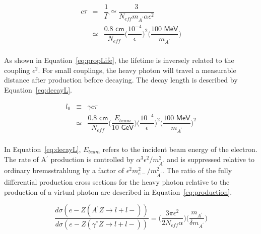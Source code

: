 \begin{eqnarray}
	\label{eq:propLife}
	c\tau &=& \dfrac{1}{\Gamma}\simeq \dfrac{3}{N_{eff}m_{A^{\prime}}\alpha\epsilon^2}\\
	&\simeq & \dfrac{0.8\textsf{ cm}}{N_{eff}}\Big({\dfrac{10^{-4}}{\epsilon}}\Big)^2\Big(\dfrac{100\textsf{ MeV}}{m_{A^{\prime}}}\Big)\\
\end{eqnarray}

As shown in Equation~\eqref{eq:propLife}, the lifetime is inversely related to the coupling $\epsilon^2$. For small couplings, the heavy photon will travel a measurable distance after production before decaying. The decay length is described by Equation~\eqref{eq:decayL}.

\begin{eqnarray}
	\label{eq:decayL}
	l_0 &\equiv &\gamma c \tau \\
	&\simeq & \dfrac{0.8\textsf{ cm}}{N_{eff}}\Big(\dfrac{E_{beam}}{10\textsf{ GeV}}\Big)\Big({\dfrac{10^{-4}}{\epsilon}}\Big)^2\Big(\dfrac{100\textsf{ MeV}}{m_{A^{\prime}}}\Big)^2\\
\end{eqnarray}

In Equation~\eqref{eq:decayL}, $E_{beam}$ refers to the incident beam energy of the electron. The rate of A$^{\prime}$ production is controlled by $\alpha^3\epsilon^2/m_{A^{\prime}}^2$ and is suppressed relative to ordinary bremsstrahlung by a factor of $\epsilon^2m_{e-}^2/m_{A^{\prime}}^2$. The ratio of the fully differential production cross sections for the heavy photon relative to the production of a virtual photon are described in Equation~\eqref{eq:production}.

\begin{equation}
	\label{eq:production}
	\dfrac{d\sigma(e-Z(A^{\prime}Z\rightarrow l+l-))}{d\sigma(e-Z(\gamma^{\ast}Z\rightarrow l+l-))} = \Big(\dfrac{3\pi\epsilon^2}{2N_{eff}\alpha}\Big) \Big(\dfrac{m_{A^{\prime}}}{\delta m_{A^{\prime}}}\Big)
\end{equation}

